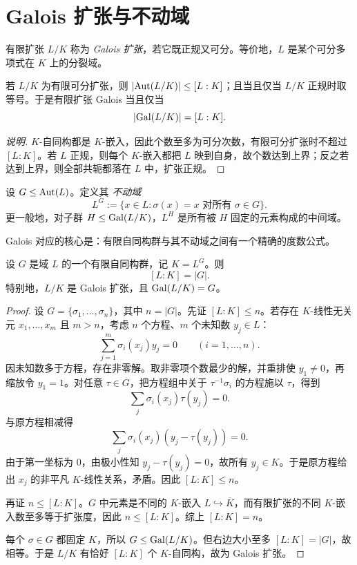 \section{Galois 扩张与不动域}

\begin{definition}
有限扩张 $L/K$ 称为 \emph{Galois 扩张}，若它既正规又可分。等价地，$L$ 是某个可分多项式在 $K$ 上的分裂域。
\end{definition}

\begin{theorem}
若 $L/K$ 为有限可分扩张，则 $|\mathrm{Aut}(L/K)|\le [L:K]$；且当且仅当 $L/K$ 正规时取等号。于是有限扩张 Galois 当且仅当
\[
 |\mathrm{Gal}(L/K)|=[L:K].
\]
\end{theorem}

\begin{proof}[说明]
$K$-自同构都是 $K$-嵌入，因此个数至多为可分次数，有限可分扩张时不超过 $[L:K]$。若 $L$ 正规，则每个 $K$-嵌入都把 $L$ 映到自身，故个数达到上界；反之若达到上界，则全部共轭都落在 $L$ 中，扩张正规。
\end{proof}

\begin{definition}
设 $G\le \mathrm{Aut}(L)$。定义其 \emph{不动域}
\[
 L^G:=\{x\in L:\sigma(x)=x\text{ 对所有 }\sigma\in G\}.
\]
更一般地，对子群 $H\le \mathrm{Gal}(L/K)$，$L^H$ 是所有被 $H$ 固定的元素构成的中间域。
\end{definition}

Galois 对应的核心是：有限自同构群与其不动域之间有一个精确的度数公式。

\begin{theorem}
设 $G$ 是域 $L$ 的一个有限自同构群，记 $K=L^G$。则
\[
 [L:K]=|G|.
\]
特别地，$L/K$ 是 Galois 扩张，且 $\mathrm{Gal}(L/K)=G$。
\end{theorem}

\begin{proof}
设 $G=\{\sigma_1,\dots,\sigma_n\}$，其中 $n=|G|$。先证 $[L:K]\le n$。若存在 $K$-线性无关元 $x_1,\dots,x_m$ 且 $m>n$，考虑 $n$ 个方程、$m$ 个未知数 $y_j\in L$：
\[
 \sum_{j=1}^m \sigma_i(x_j)y_j=0\qquad (i=1,\dots,n).
\]
因未知数多于方程，存在非零解。取非零项个数最少的解，并重排使 $y_1\ne 0$，再缩放令 $y_1=1$。对任意 $\tau\in G$，把方程组中关于 $\tau^{-1}\sigma_i$ 的方程施以 $\tau$，得到
\[
 \sum_j \sigma_i(x_j)\tau(y_j)=0.
\]
与原方程相减得
\[
 \sum_j \sigma_i(x_j)(y_j-\tau(y_j))=0.
\]
由于第一坐标为 $0$，由极小性知 $y_j-\tau(y_j)=0$，故所有 $y_j\in K$。于是原方程给出 $x_j$ 的非平凡 $K$-线性关系，矛盾。因此 $[L:K]\le n$。

再证 $n\le [L:K]$。$G$ 中元素是不同的 $K$-嵌入 $L\hookrightarrow \overline K$，而有限扩张的不同 $K$-嵌入数至多等于扩张度，因此 $n\le [L:K]$。综上 $[L:K]=n$。

每个 $\sigma\in G$ 都固定 $K$，所以 $G\le \mathrm{Gal}(L/K)$。但右边大小至多 $[L:K]=|G|$，故相等。于是 $L/K$ 有恰好 $[L:K]$ 个 $K$-自同构，故为 Galois 扩张。
\end{proof}

